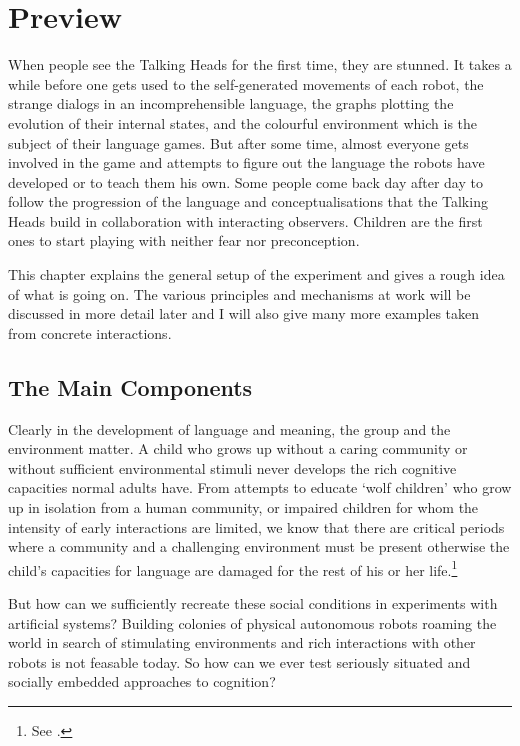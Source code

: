 \chapter{Preview}

\setcounter{foot}{1}
When people see the Talking Heads for the first time, they 
are stunned. It takes a while before
one gets used to the self-generated movements of each robot, 
the strange dialogs in an incomprehensible language, 
the graphs plotting the evolution of their internal
states, 
and the colourful environment which is the subject of their 
language games. But after some time, almost everyone gets involved 
in the game and attempts to figure out the language the robots
have developed or to teach them his own. 
Some people come back
day after day to follow the progression
of the language and conceptualisations that the Talking Heads 
build in collaboration with interacting observers.
Children are the first ones to 
start playing with neither fear nor preconception. 

This chapter explains the general setup of the 
experiment and gives a rough idea of what is going on. 
The various principles and mechanisms at work 
will be discussed in more detail later and I will also give many 
more examples taken from concrete interactions.

\section{The Main Components}

Clearly in the development of language and meaning, 
the group and the environment matter. A child 
who grows up without a caring 
community or without sufficient environmental stimuli
never develops the rich cognitive capacities 
normal adults have. From attempts to educate `wolf children'
who grow up in isolation from a human community, or 
impaired children for whom the intensity of early 
interactions are limited, we know that 
there are critical periods
where a community and a challenging environment must be
present otherwise the child's capacities for language
are damaged for the 
rest of his or her life.\footnote{See \cite{Tager:1994}.}

But how can we sufficiently 
recreate these social conditions in experiments 
with artificial systems? 
Building colonies of physical autonomous robots
roaming the world in search of stimulating 
environments and rich interactions with
other robots is not feasable today. So how 
can we ever test seriously situated and 
socially embedded approaches to cognition? 

